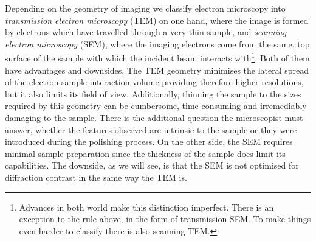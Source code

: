 Depending on the geometry of imaging we classify electron microscopy into \textit{transmission electron microscopy} (TEM) on one hand, where the image is formed by electrons which have travelled through a very thin sample, and \textit{scanning electron microscopy} (SEM), where the imaging electrons come from the same, top surface of the sample with which the incident beam interacts with\footnote{ Advances in both world make this distinction imperfect. There is an exception to the rule above, in the form of transmission SEM. To make things even harder to classify there is also scanning TEM.}. Both of them have advantages and downsides. The TEM geometry minimises the lateral spread of the electron-sample interaction volume providing therefore higher resolutions, but it also limits its field of view. Additionally, thinning the sample to the sizes required by this geometry can be cumbersome, time consuming and irremediably damaging to the sample. There is the additional question the microscopist must answer, whether the features observed are intrinsic to the sample or they were introduced during the polishing process. On the other side, the SEM requires minimal sample preparation since the thickness of the sample does limit its capabilities. The downside, as we will see, is that the SEM is not optimised for diffraction contrast in the same way the TEM is. 


